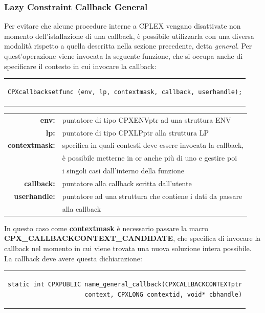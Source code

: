 \subsubsection{Lazy Constraint Callback General}
Per evitare che alcune procedure interne a CPLEX vengano disattivate non momento dell'istallazione di una callback, è possibile utilizzarla con una diversa modalità rispetto a quella descritta nella sezione precedente, detta \textit{general}. Per quest'operazione viene invocata la seguente funzione, che si occupa anche di specificare il contesto in cui invocare la callback:
\begin{center}
\begin{tabular}{c}
\begin{lstlisting}[linewidth=382pt, basicstyle=\footnotesize\sffamily,]    
CPXcallbacksetfunc (env, lp, contextmask, callback, userhandle);
\end{lstlisting}
\end{tabular}
\end{center}
\begin{table}[h]
\centering
\begin{tabular}{rl}
\textbf{env:} & {puntatore di tipo CPXENVptr ad una struttura ENV}\\
\textbf{lp:} & {puntatore di tipo CPXLPptr alla struttura LP}\\
\textbf{contextmask:} & {specifica in quali contesti deve essere invocata la callback,}\\
&{è possibile metterne in or anche più di uno e gestire poi}\\
&{i singoli casi dall'interno della funzione}\\
\textbf{callback:} & {puntatore alla callback scritta dall'utente} \\
\textbf{userhandle:} & {puntatore ad una struttura che contiene i dati da passare} \\
&{alla callback}\\
\end{tabular}
\end{table}
In questo caso come \textbf{contextmask} è necessario passare la macro\\ 
\textbf{CPX\_CALLBACKCONTEXT\_CANDIDATE}, che specifica di invocare la callback nel momento in cui viene trovata una nuova soluzione intera possibile.\\
La callback deve avere questa dichiarazione:
\begin{center}
\begin{tabular}{c}
\begin{lstlisting}[linewidth=382pt, basicstyle=\footnotesize\sffamily,]    
static int CPXPUBLIC name_general_callback(CPXCALLBACKCONTEXTptr
                     context, CPXLONG contextid, void* cbhandle)
\end{lstlisting}
\end{tabular}
\end{center}
